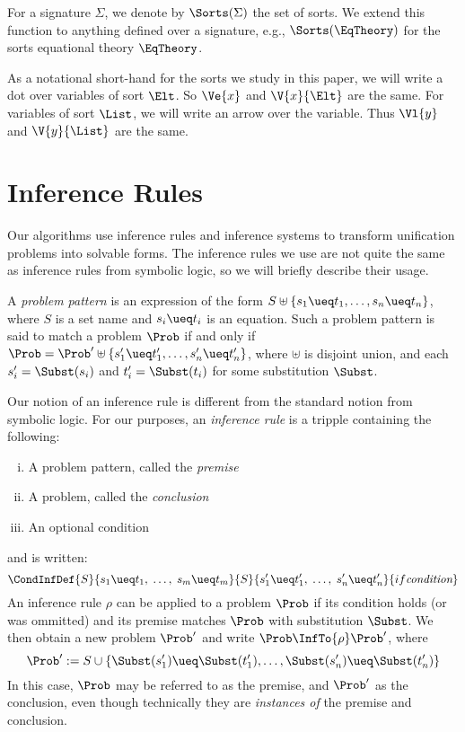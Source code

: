 For a signature $\Sigma$, we denote by $\Sorts(\Sigma)$ the set of sorts. We
extend this function to anything defined over a signature, e.g.,
$\Sorts(\EqTheory)$ for the sorts equational theory $\EqTheory$.

As a notational short-hand for the sorts we study in this paper, we will write
a dot over variables of sort $\Elt$. So $\Ve{x}$ and $\V{x}{\Elt}$ are the
same. For variables of sort $\List$, we will write an arrow over the variable.
Thus $\Vl{y}$ and $\V{y}{\List}$ are the same.

\section{Inference Rules}\label{sec:inf-rules}

Our algorithms use inference rules and inference systems to transform
unification problems into solvable forms. The inference rules we use are
not quite the same as inference rules from symbolic logic, so we will briefly
describe their usage.

A \emph{problem pattern} is an expression of the form $S \uplus \{ s_1 \ueq
t_1, \dotsc, s_n \ueq t_n \}$, where $S$ is a set name and $s_i \ueq t_i$ is an
equation. Such a problem pattern is said to match a problem $\Prob$ if and only
if $\Prob = \Prob' \uplus \{ s'_1 \ueq t'_1, \dotsc, s'_n \ueq t'_n \}$, where
$\uplus$ is disjoint union, and each $s'_i = \Subst(s_i)$ and $t'_i =
\Subst(t_i)$ for some substitution $\Subst$.

Our notion of an inference rule is different from the standard notion from
symbolic logic. For our purposes, an \emph{inference rule} is a tripple
containing the following:
\begin{enumerate}[(i)]
    \item A problem pattern, called the \emph{premise}
    \item A problem, called the \emph{conclusion}
    \item An optional condition
\end{enumerate}
and is written:
\[\CondInfDef
    {S}{s_1 \ueq t_1, \; \dotsc, \; s_m \ueq t_m}
    {S}{s'_1 \ueq t'_1, \; \dotsc, \; s'_n \ueq t'_n}
    {if \textit{condition}}
\]
An inference rule $\rho$ can be applied to a problem $\Prob$ if its condition
holds (or was ommitted) and its premise matches $\Prob$ with substitution
$\Subst$. We then obtain a new problem $\Prob'$ and write $\Prob \InfTo{\rho}
\Prob'$, where
\[ \Prob' := S \cup \{ \Subst(s'_1) \ueq \Subst(t'_1), \dotsc, \Subst(s'_n)
\ueq \Subst(t'_n) \} \]
In this case, $\Prob$ may be referred to as the premise, and $\Prob'$ as the
conclusion, even though technically they are \emph{instances of} the premise
and conclusion.

